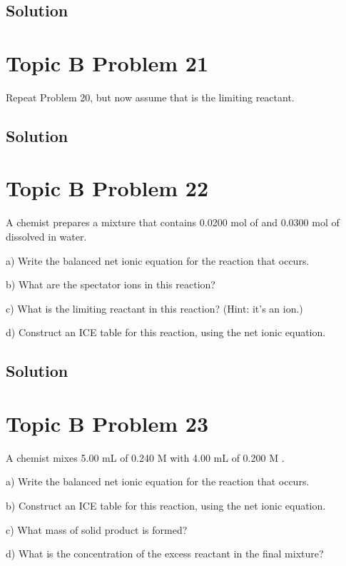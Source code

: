 \documentclass[10pt]{article}
\begin{document}
        \subsection{Solution}

    \pagebreak
    \section{Topic B Problem 21}
        Repeat Problem 20, but now assume that  is the limiting reactant.

        \subsection{Solution}

    \pagebreak
    \section{Topic B Problem 22}
        A chemist prepares a mixture that contains 0.0200 mol of  and 0.0300 mol of  dissolved in water.
        
        a) Write the balanced net ionic equation for the reaction that occurs.
        
        b) What are the spectator ions in this reaction?
        
        c) What is the limiting reactant in this reaction? (Hint: it's an ion.)
        
        d) Construct an ICE table for this reaction, using the net ionic equation.

        \subsection{Solution}

    \pagebreak
    \section{Topic B Problem 23}
        A chemist mixes 5.00 mL of 0.240 M  with 4.00 mL of 0.200 M .
        
        a) Write the balanced net ionic equation for the reaction that occurs.
        
        b) Construct an ICE table for this reaction, using the net ionic equation.
        
        c) What mass of solid product is formed?
        
        d) What is the concentration of the excess reactant in the final mixture?
        
\end{document}
